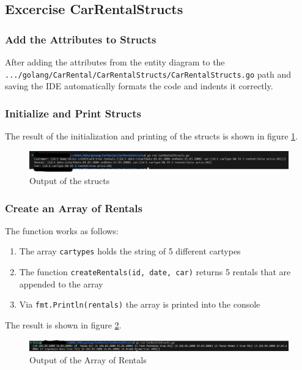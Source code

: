 \subsection{Excercise CarRentalStructs}
\label{sec:car_rental_structs}

\subsubsection*{Add the Attributes to Structs}
After adding the attributes from the entity diagram to the 
\texttt{.../golang/CarRental/CarRentalStructs/CarRentalStructs.go} path and saving
the IDE automatically formats the code and indents it correctly.

\subsubsection*{Initialize and Print Structs}
The result of the initialization and printing of the structs is shown in figure \ref{fig:car_rental_structs}.
\begin{figure}[H]
    \centering
    \includegraphics[width=\textwidth]{figures/goLang/carRental/carRental_structs.png}
    \caption{Output of the structs}
    \label{fig:car_rental_structs}
\end{figure}

\subsubsection*{Create an Array of Rentals}
The function works as follows:
\begin{enumerate}
    \item The array \texttt{cartypes} holds the string of 5 different cartypes
    \item The function \texttt{createRentals(id, date, car)} returns 5 rentals that are appended to the array
    \item Via \texttt{fmt.Println(rentals)} the array is printed into the console
\end{enumerate}

The result is shown in figure \ref{fig:car_rental_array_five_rentals}.
\begin{figure}[H]
    \centering
    \includegraphics[width=\textwidth]{figures/goLang/carRental/carRental_arrayFiveRentals.png}
    \caption{Output of the Array of Rentals}
    \label{fig:car_rental_array_five_rentals}
\end{figure}

